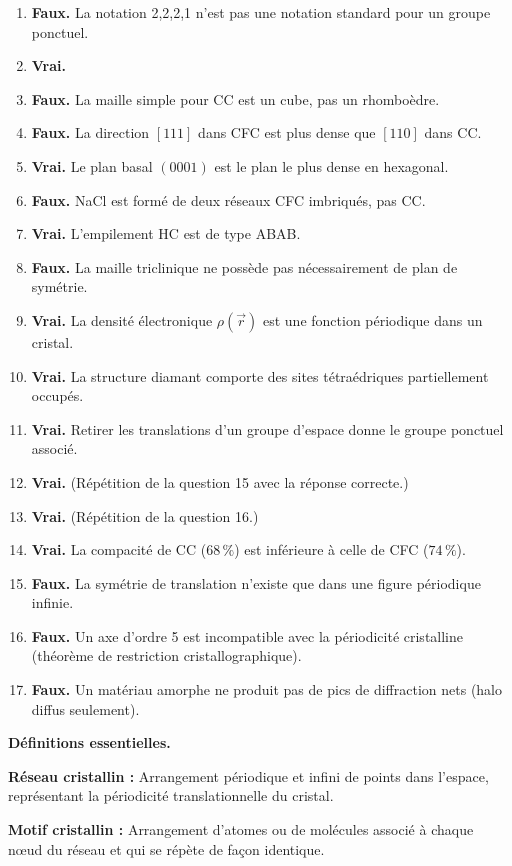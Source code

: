 \documentclass[12pt,a4paper]{article}
\begin{document}
\begin{boitecorrige}
\begin{enumerate}
\item \textbf{Faux.} La notation 2,2,2,1 n'est pas une notation standard pour un groupe ponctuel.
\item \textbf{Vrai.}
\item \textbf{Faux.} La maille simple pour CC est un cube, pas un rhomboèdre.
\item \textbf{Faux.} La direction $[111]$ dans CFC est plus dense que $[110]$ dans CC.
\item \textbf{Vrai.} Le plan basal $(0001)$ est le plan le plus dense en hexagonal.
\item \textbf{Faux.} NaCl est formé de deux réseaux CFC imbriqués, pas CC.
\item \textbf{Vrai.} L'empilement HC est de type ABAB.
\item \textbf{Faux.} La maille triclinique ne possède pas nécessairement de plan de symétrie.
\item \textbf{Vrai.} La densité électronique $\rho(\vec{r})$ est une fonction périodique dans un cristal.
\item \textbf{Vrai.} La structure diamant comporte des sites tétraédriques partiellement occupés.
\item \textbf{Vrai.} Retirer les translations d'un groupe d'espace donne le groupe ponctuel associé.
\item \textbf{Vrai.} (Répétition de la question 15 avec la réponse correcte.)
\item \textbf{Vrai.} (Répétition de la question 16.)
\item \textbf{Vrai.} La compacité de CC ($68\,\%$) est inférieure à celle de CFC ($74\,\%$).
\item \textbf{Faux.} La symétrie de translation n'existe que dans une figure périodique infinie.
\item \textbf{Faux.} Un axe d'ordre 5 est incompatible avec la périodicité cristalline (théorème de restriction cristallographique).
\item \textbf{Faux.} Un matériau amorphe ne produit pas de pics de diffraction nets (halo diffus seulement).
\end{enumerate}

\textbf{Définitions essentielles.}

\textbf{Réseau cristallin :} Arrangement périodique et infini de points dans l'espace, représentant la périodicité translationnelle du cristal.

\textbf{Motif cristallin :} Arrangement d'atomes ou de molécules associé à chaque n\oe{}ud du réseau et qui se répète de façon identique.


\end{boitecorrige}
\end{document}
